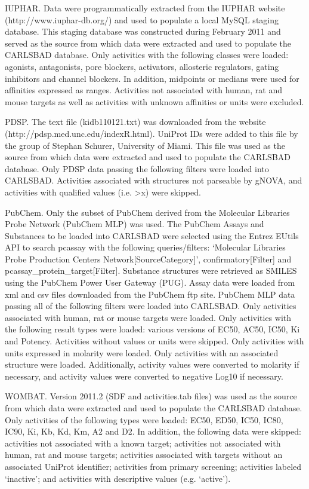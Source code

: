 IUPHAR. Data were programmatically extracted from the IUPHAR website (http://www.iuphar-db.org/) and used to populate a local MySQL staging database. This staging database was constructed during February 2011 and served as the source from which data were extracted and used to populate the CARLSBAD database. Only activities with the following classes were loaded: agonists, antagonists, pore blockers, activators, allosteric regulators, gating inhibitors and channel blockers. In addition, midpoints or medians were used for affinities expressed as ranges. Activities not associated with human, rat and mouse targets as well as activities with unknown affinities or units were excluded.

PDSP. The text file (kidb110121.txt) was downloaded from the website (http://pdsp.med.unc.edu/indexR.html). UniProt IDs were added to this file by the group of Stephan Schurer, University of Miami. This file was used as the source from which data were extracted and used to populate the CARLSBAD database. Only PDSP data passing the following filters were loaded into CARLSBAD. Activities associated with structures not parseable by gNOVA, and activities with qualified values (i.e. >x) were skipped.

PubChem. Only the subset of PubChem derived from the Molecular Libraries Probe Network (PubChem MLP) was used. The PubChem Assays and Substances to be loaded into CARLSBAD were selected using the Entrez EUtils API to search pcassay with the following queries/filters: ‘Molecular Libraries Probe Production Centers Network[SourceCategory]’, confirmatory[Filter] and pcassay\_protein\_target[Filter]. Substance structures were retrieved as SMILES using the PubChem Power User Gateway (PUG). Assay data were loaded from xml and csv files downloaded from the PubChem ftp site. PubChem MLP data passing all of the following filters were loaded into CARLSBAD. Only activities associated with human, rat or mouse targets were loaded. Only activities with the following result types were loaded: various versions of EC50, AC50, IC50, Ki and Potency. Activities without values or units were skipped. Only activities with units expressed in molarity were loaded. Only activities with an associated structure were loaded. Additionally, activity values were converted to molarity if necessary, and activity values were converted to negative Log10 if necessary.

WOMBAT. Version 2011.2 (SDF and activities.tab files) was used as the source from which data were extracted and used to populate the CARLSBAD database. Only activities of the following types were loaded: EC50, ED50, IC50, IC80, IC90, Ki, Kb, Kd, Km, A2 and D2. In addition, the following data were skipped: activities not associated with a known target; activities not associated with human, rat and mouse targets; activities associated with targets without an associated UniProt identifier; activities from primary screening; activities labeled ‘inactive’; and activities with descriptive values (e.g. ‘active’).

